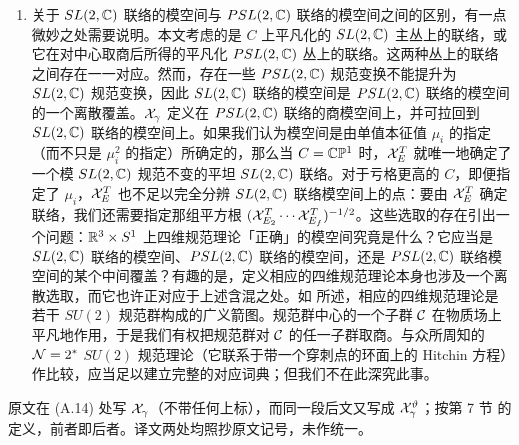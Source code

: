 \begin{enumerate}
存在一个依赖于 $\zeta$ 的幂零超对称算符 $Q_\zeta$，它湮灭这些算符；因此它们是超对称 't Hooft--Wilson 线算符的类似物，与 \cite{Maldacena:1998im,Rey:1998ik,geom-lang-n4} 中所讨论的那些相仿。按此解释，方程 \eqref{eq:UV-IR-monodromy} 编码了一些有趣的物理，我们希望另文讨论。

\item 关于 $SL(2,\mathbb{C})$ 联络的模空间与 $PSL(2,\mathbb{C})$ 联络的模空间之间的区别，有一点微妙之处需要说明。本文考虑的是 $C$ 上平凡化的 $SL(2,\mathbb{C})$ 主丛上的联络，或它在对中心取商后所得的平凡化 $PSL(2,\mathbb{C})$ 丛上的联络。这两种丛上的联络之间存在一一对应。然而，存在一些 $PSL(2,\mathbb{C})$ 规范变换不能提升为 $SL(2,\mathbb{C})$ 规范变换，因此 $SL(2,\mathbb{C})$ 联络的模空间是 $PSL(2,\mathbb{C})$ 联络的模空间的一个离散覆盖。$\mathcal{X}_{\gamma}$ 定义在 $PSL(2,\mathbb{C})$ 联络的商模空间上，并可拉回到 $SL(2,\mathbb{C})$ 联络的模空间上。如果我们认为模空间是由单值本征值 $\mu_i$ 的指定（而不只是 $\mu_i^2$ 的指定）所确定的，那么当 $C = \mathbb{C} \mathbb{P}^1$ 时，$\mathcal{X}_E^T$ 就唯一地确定了一个模 $SL(2,\mathbb{C})$ 规范不变的平坦 $SL(2,\mathbb{C})$ 联络。对于亏格更高的 $C$，即便指定了 $\mu_i$，$\mathcal{X}_E^T$ 也不足以完全分辨 $SL(2,\mathbb{C})$ 联络模空间上的点：要由 $\mathcal{X}_E^T$ 确定联络，我们还需要指定那组平方根 $(\mathcal{X}_{E_2}^T \cdots \mathcal{X}_{E_f}^T)^{-1/2}$。这些选取的存在引出一个问题：$\mathbb{R}^3 \times S^1$ 上四维规范理论「正确」的模空间究竟是什么？它应当是 $SL(2,\mathbb{C})$ 联络的模空间、$PSL(2,\mathbb{C})$ 联络的模空间，还是 $PSL(2,\mathbb{C})$ 联络模空间的某个中间覆盖？有趣的是，定义相应的四维规范理论本身也涉及一个离散选取，而它也许正对应于上述含混之处。如 \cite{Gaiotto:2009we} 所述，相应的四维规范理论是若干 $SU(2)$ 规范群构成的广义箭图。规范群中心的一个子群 $\mathcal{C}$ 在物质场上平凡地作用，于是我们有权把规范群对 $\mathcal{C}$ 的任一子群取商。与众所周知的 $\mathcal{N}=2^*$ $SU(2)$ 规范理论（它联系于带一个穿刺点的环面上的 Hitchin 方程）作比较，应当足以建立完整的对应词典；但我们不在此深究此事。

\end{enumerate}

\begin{yizhu}
原文在 (A.14) 处写 $\mathcal{X}_\gamma$（不带任何上标），而同一段后文又写成 $\mathcal{X}_\gamma^\vartheta$；按第 7 节%
的定义，前者即后者。译文两处均照抄原文记号，未作统一。
\end{yizhu}
